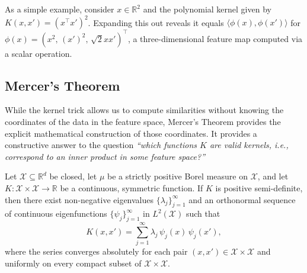 As a simple example, consider $x \in \mathbb{R}^2$ and the polynomial kernel given by $K(x, x') = (x^\top x')^2$. Expanding this out reveals it equals $\langle \phi(x), \phi(x') \rangle$ for $\phi(x) = (x^2,\, (x')^2,\, \sqrt{2} x x')^\top$, a three-dimensional feature map computed via a scalar operation.

\subsection{Mercer's Theorem}

While the kernel trick allows us to compute similarities without knowing the coordinates of the data in the feature space, Mercer’s Theorem provides the explicit mathematical construction of those coordinates. It provides a constructive answer to the question {\em ``which functions $K$ are valid kernels, i.e., correspond to an inner product in some feature space?''} 




\begin{theorem}\label{th:mercer}
Let $\mathcal{X} \subseteq \mathbb{R}^d$ be closed, 
 let $\mu$ be a strictly positive Borel measure on ${\mathcal X}$, and let $K: \mathcal{X} \times \mathcal{X} \to \mathbb{R}$ be a continuous, symmetric function. If $K$ is positive semi-definite, then there exist non-negative eigenvalues $\{\lambda_j\}_{j=1}^\infty$ and an orthonormal sequence of continuous eigenfunctions $\{\psi_j\}_{j=1}^\infty$ in $L^2(\mathcal{X})$ such that
\begin{equation}
    K(x, x') = \sum_{j=1}^{\infty} \lambda_j\, \psi_j(x)\, \psi_j(x'),
\end{equation}
where the series converges absolutely for each pair $(x,x') \in \mathcal{X} \times \mathcal{X}$
and uniformly on every compact subset of $\mathcal{X} \times \mathcal{X}$.
\end{theorem}

